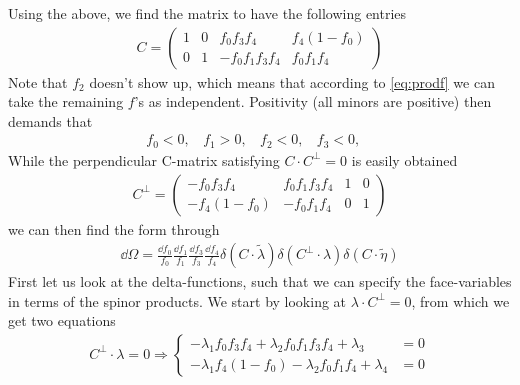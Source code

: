 \documentclass[letter,11pt]{article}
\begin{document}
Using the above, we find the matrix to have the following entries
\begin{equation}
	\begin{aligned}
		C=
		\begin{pmatrix}
			1 & 0 & f_0f_3f_4 & f_4(1-f_0)\\
			0 & 1 & -f_0f_1f_3f_4&f_0f_1f_4
		\end{pmatrix}
	\end{aligned}
\end{equation}
Note that $f_2$ doesn't show up, which means that according to \eqref{eq:prodf} we can take the remaining $f$'s as independent. Positivity (all minors are positive) then demands that
\begin{equation}
	\begin{aligned}
		f_0<0,~~~~f_1>0,~~~~f_2<0,~~~~f_3<0,~~~~
	\end{aligned}
\end{equation}
While the perpendicular C-matrix satisfying $C\cdot C^\perp=0$ is easily obtained
\begin{equation}
	\begin{aligned}
		C^\perp=
		\begin{pmatrix}
		 -f_0f_3f_4 &f_0f_1f_3f_4 & 1 & 0\\
		-f_4(1-f_0) &-f_0f_1f_4 & 0 & 1
		\end{pmatrix}
	\end{aligned}
\end{equation}
we can then find the form through
\begin{equation}
	\begin{aligned}
		\dd \Omega =\frac{\dd f_0}{f_0}\frac{\dd f_1}{f_1}\frac{\dd f_3}{f_3}\frac{\dd f_4}{f_4}\delta(C\cdot \tilde \lambda) \delta(C^\perp\cdot \lambda)\delta(C\cdot \tilde \eta)
	\end{aligned}
\end{equation}
First let us look at the delta-functions, such that we can specify the face-variables in terms of the spinor products. We start by looking at $\lambda \cdot C^\perp=0$, from which we get two equations
\begin{equation}
	\begin{aligned}
		C^\perp\cdot \lambda=0\Rightarrow\begin{cases}
			-\lambda_1f_0f_3f_4+\lambda_2 f_0f_1f_3f_4+ \lambda_3&=0\\
			-\lambda_1f_4(1-f_0)-\lambda_2f_0f_1f_4+ \lambda_4&=0
		\end{cases}
	\end{aligned}
\end{equation}
\end{document}
